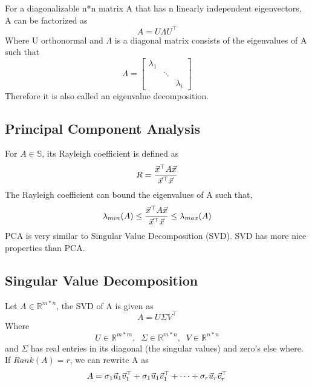 \begin{theorem}
	For a diagonalizable n*n matrix A that has n linearly independent eigenvectors, A can be factorized as
	\[
A = U\Lambda U^\top
	\]
	Where U orthonormal and $\Lambda$ is a diagonal matrix consists of the eigenvalues of A such that
	\[
\Lambda = \begin{bmatrix}
	\lambda_1 & & \\
	& \ddots & \\
	& & \lambda_i
\end{bmatrix}
	\]
	Therefore it is also called an eigenvalue decomposition.
\end{theorem}


\subsection{Principal Component Analysis} %
\label{sub:principal_component_analysis}

\begin{definition}
	For $A\in\mathbb{S}$, its Rayleigh coefficient is defined as
	\[
R = \frac{\vec{x}^\top A\vec{x}}{\vec{x}^\top\vec{x}}
	\]
	The Rayleigh coefficient can bound the eigenvalues of A such that,
	\[
\lambda_{min}(A) \le \frac{\vec{x}^\top A\vec{x}}{\vec{x}^\top\vec{x}} \le \lambda_{max}(A)
	\]
	PCA is very similar to Singular Value Decomposition (SVD). SVD has more nice properties than PCA.
\end{definition}



\subsection{Singular Value Decomposition} %
\label{sub:singular_value_decomposition}

\begin{theorem}[SVD]
	Let $A \in \mathbb{R}^{m*n}$, the SVD of A is given as
	\[
A = U \Sigma V^\top
	\]
	Where
	\[
	U\in\mathbb{R}^{m*m},\;\; \Sigma\in\mathbb{R}^{m*n},\;\;V\in\mathbb{R}^{n*n}
	\]
	and $\Sigma$ has real entries in its diagonal (the singular values) and zero's else where.
	If $Rank(A)=r$, we can rewrite A as
	\[
A = \sigma_1\vec{u}_1\vec{v}^\top_1 + \sigma_1\vec{u}_1\vec{v}^\top_1 + \cdots + \sigma_r\vec{u}_r\vec{v}^\top_r
	\]
\end{theorem}

